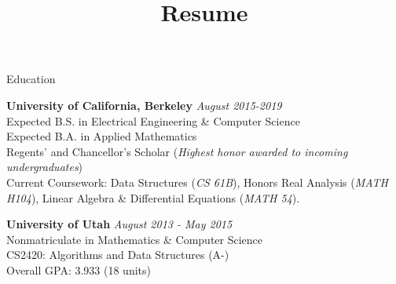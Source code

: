 \documentclass{resume} %
\title{Resume}
\begin{document}

\begin{rSection}{Education}

{\bf University of California, Berkeley} \hfill {\em August 2015-2019} \\ 
Expected B.S. in  Electrical Engineering \& Computer Science\\
Expected B.A. in Applied Mathematics \\
Regents' and Chancellor's Scholar (\textit{Highest honor awarded to incoming undergraduates}) \\
Current Coursework: Data Structures (\textit{CS 61B}), {Honors} Real Analysis (\textit{MATH H104}), Linear Algebra \& Differential Equations (\textit{MATH 54}). 

{\bf University of Utah} \hfill {\em August 2013 - May 2015} \\ 
Nonmatriculate in Mathematics \& Computer Science \\
CS2420: Algorithms and Data Structures (A-) \\
Overall GPA: 3.933 (18 units) \\

\end{rSection}

\end{document}
